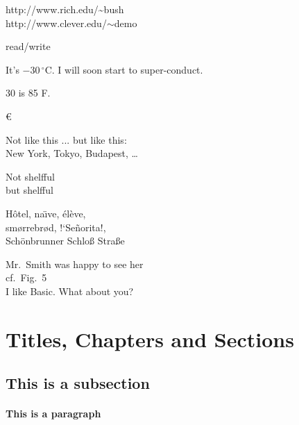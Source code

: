 \documentclass[a4paper,11pt]{book}
\begin{document}
  http://www.rich.edu/\~{}bush \\
  http://www.clever.edu/$\sim$demo

  read\slash write

  It's $-30\,^{\circ}\mathrm{C}$.
  I will soon start to 
  super-conduct.

  30 \textcelsius{} is
  85 \textdegree{}F.

  \texteuro
  \euro

  Not like this ... but like this:\\
  New York, Tokyo, Budapest, \ldots

  \Large Not shelfful\\
  but shelf\mbox{}ful

  \normalsize 
  H\^otel, na\"\i ve, \'el\`eve,\\
  sm\o rrebr\o d, !`Se\~norita!,\\
  Sch\"onbrunner Schlo\ss{} 
  Stra\ss e

  Mr.~Smith was happy to see her\\
  cf.~Fig.~5\\
  I like Basic\@. What about you?

  \section{Titles, Chapters and Sections}

  \subsection{This is a subsection}

  \paragraph{This is a paragraph}
\end{document}
